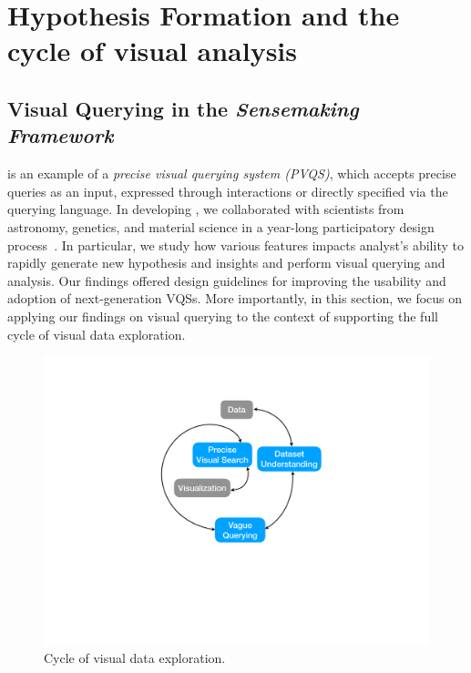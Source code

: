 \section{Hypothesis Formation and the cycle of visual analysis\label{sec:hypothesis}}
\subsection{Visual Querying in the \textit{Sensemaking Framework}}
\zv is an example of a \emph{precise visual querying system (PVQS)}, which accepts precise queries as an input, expressed through interactions or directly specified via the querying language. In developing \zv, we collaborated with scientists from astronomy, genetics, and material science in a year-long participatory design process~\cite{Lee2017}. In particular, we study how various features impacts analyst's ability to rapidly generate new hypothesis and insights and perform visual querying and analysis. Our findings offered design guidelines for improving the usability and adoption of next-generation VQSs. More importantly, in this section, we focus on applying our findings on visual querying to the context of supporting the full cycle of visual data exploration. 
\begin{figure}[h!]
\label{fig:cycle}
\centering
\includegraphics[width=0.5\linewidth]{figures/cycle.pdf}
\caption{Cycle of visual data exploration.}
\end{figure}
